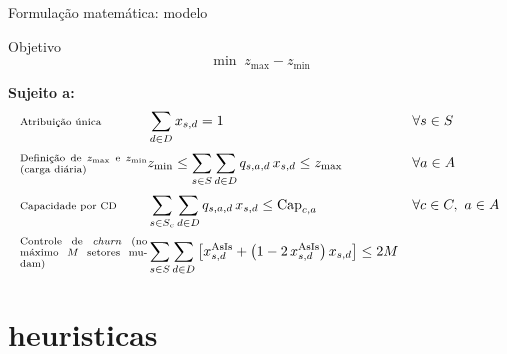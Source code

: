 \documentclass[aspectratio=169,11pt]{beamer}
\begin{document}
\begin{frame}{Formulação matemática: modelo}
    \begin{block}{Objetivo}
        \vspace{-0.3cm}
        \[ \min\; z_{\max}-z_{\min} \]
    \end{block}

    \small
    \setlength{\abovedisplayskip}{3pt}
    \setlength{\belowdisplayskip}{3pt}
    \setlength{\abovedisplayshortskip}{2pt}
    \setlength{\belowdisplayshortskip}{2pt}

    \textbf{Sujeito a:}
    \begin{align}
        \makebox[3.2cm][l]{\scriptsize Atribuição única}
        & \sum_{d \in D} x_{s,d} = 1
            && \forall s \in S
            \label{eq:assign} \\[2pt]
        \makebox[3.2cm][l]{\scriptsize\parbox{3.2cm}{Definição de $z_{\max}$ e $z_{\min}$ (carga diária)}}
        & z_{\min} \le \sum_{s \in S} \sum_{d \in D} q_{s,a,d}\, x_{s,d} \le z_{\max}
            && \forall a \in A
            \label{eq:zminmax} \\[2pt]
        \makebox[3.2cm][l]{\scriptsize Capacidade por CD}
        & \sum_{s \in S_c} \sum_{d \in D} q_{s,a,d}\, x_{s,d} \le \text{Cap}_{c,a}
            && \forall c \in C,\ a \in A
            \label{eq:capacity} \\[2pt]
        \makebox[3.2cm][l]{\scriptsize\parbox{3.2cm}{Controle de \textit{churn} (no máximo $M$ setores mudam)}}
        & \sum_{s \in S}\sum_{d \in D} \left[ x^{\text{AsIs}}_{s,d} + \left(1-2\,x^{\text{AsIs}}_{s,d}\right) x_{s,d} \right] \le 2M
            \label{eq:churn}
    \end{align}
\end{frame}


\section{heuristicas}
\end{document}
